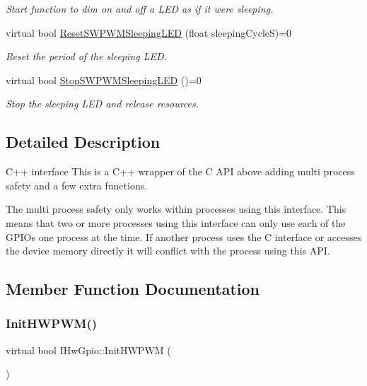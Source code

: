 \begin{Indent}
\begin{DoxyCompactItemize}
\begin{DoxyCompactList}\small\item\em Start function to dim on and off a L\+ED as if it were sleeping. \end{DoxyCompactList}\item 
virtual bool \hyperlink{classIHwGpio_a897e1e8f2dc07a57451f1d8286c50261}{Reset\+S\+W\+P\+W\+M\+Sleeping\+L\+ED} (float sleeping\+CycleS)=0
\begin{DoxyCompactList}\small\item\em Reset the period of the sleeping L\+ED. \end{DoxyCompactList}\item 
virtual bool \hyperlink{classIHwGpio_a765a2ec2a649074f0cd9e90e8148fbf7}{Stop\+S\+W\+P\+W\+M\+Sleeping\+L\+ED} ()=0
\begin{DoxyCompactList}\small\item\em Stop the sleeping L\+ED and release resources. \end{DoxyCompactList}\end{DoxyCompactItemize}
\end{Indent}


\subsection{Detailed Description}
C++ interface This is a C++ wrapper of the C A\+PI above adding multi process safety and a few extra functions. 

The multi process safety only works within processes using this interface. This means that two or more processes using this interface can only use each of the G\+P\+I\+Os one process at the time. If another process uses the C interface or accesses the device memory directly it will conflict with the process using this A\+PI. 

\subsection{Member Function Documentation}
\mbox{\label{classIHwGpio_ae383c9085032483c3e7edd50ae6b3989}} 
\subsubsection{\texorpdfstring{Init\+H\+W\+P\+W\+M()}{InitHWPWM()}}
{\footnotesize\ttfamily virtual bool I\+Hw\+Gpio\+::\+Init\+H\+W\+P\+WM (\begin{DoxyParamCaption}{ }\end{DoxyParamCaption})\hspace{0.3cm}{\ttfamily [pure virtual]}}



